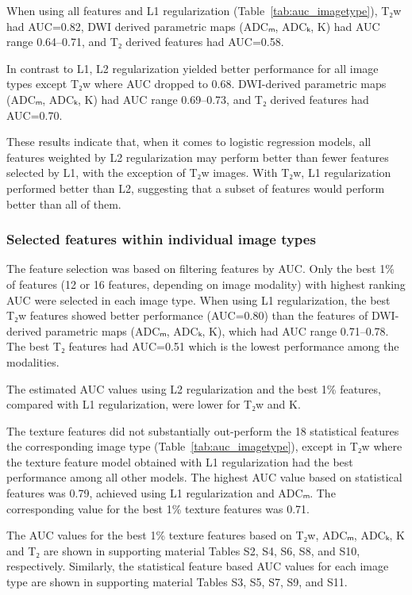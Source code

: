 When using all features and L1 regularization (Table~\ref{tab:auc_imagetype}),
T₂w had AUC=0.82, DWI derived parametric maps (ADCₘ, ADCₖ, K) had AUC range
0.64--0.71, and T₂ derived features had AUC=0.58.

In contrast to L1, L2 regularization yielded better performance for all image
types except T₂w where AUC dropped to 0.68. DWI-derived parametric maps (ADCₘ,
ADCₖ, K) had AUC range 0.69--0.73, and T₂ derived features had AUC=0.70.

These results indicate that, when it comes to logistic regression models, all
features weighted by L2 regularization may perform better than fewer features
selected by L1, with the exception of T₂w images. With T₂w, L1 regularization
performed better than L2, suggesting that a subset of features would perform
better than all of them.


\subsubsection{Selected features within individual image types}

The feature selection was based on filtering features by AUC\@. Only the best
1\% of features (12 or 16 features, depending on image modality) with highest
ranking AUC were selected in each image type. When using L1 regularization, the
best T₂w features showed better performance (AUC=0.80) than the features of
DWI-derived parametric maps (ADCₘ, ADCₖ, K), which had AUC range 0.71--0.78. The
best T₂ features had AUC=0.51 which is the lowest performance among the
modalities.

The estimated AUC values using L2 regularization and the best 1\% features,
compared with L1 regularization, were lower for T₂w and K.

The texture features did not substantially out-perform the 18 statistical
features the corresponding image type (Table~\ref{tab:auc_imagetype}), except in
T₂w where the texture feature model obtained with L1 regularization had the best
performance among all other models. The highest AUC value based on statistical
features was 0.79, achieved using L1 regularization and ADCₘ. The corresponding
value for the best 1\% texture features was 0.71.

The AUC values for the best 1\% texture features based on T₂w, ADCₘ, ADCₖ, K
and T₂ are shown in supporting material Tables S2, S4, S6, S8, and S10,
respectively. Similarly, the statistical feature based AUC values for each image
type are shown in supporting material Tables S3, S5, S7, S9, and S11.


